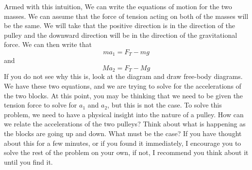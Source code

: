 \documentclass{article}[gray]
\numberwithin{equation}{subsection}
\begin{document}
Armed with this intuition, We can write the equations of motion for the two masses. We can assume that the force of tension acting on both of the masses will be the same. We will take that the positive direction is in the direction of the pulley and the downward direction will be in the direction of the gravitational force. We can then write that \begin{equation}ma_1 = F_{T}-mg\end{equation} and \begin{equation}Ma_2 = F_T-Mg\end{equation} If you do not see why this is, look at the diagram and draw free-body diagrams. We have these two equations, and we are trying to solve for the accelerations of the two blocks. At this point, you may be thinking that we need to be given the tension force to solve for $a_1$ and $a_2$, but this is not the case. To solve this problem, we need to have a physical insight into the nature of a pulley. How can we relate the accelerations of the two pulleys? Think about what is happening as the blocks are going up and down. What must be the case? If you have thought about this for a few minutes, or if you found it immediately, I encourage you to solve the rest of the problem on your own, if not, I recommend you think about it until you find it. 
\end{document}
